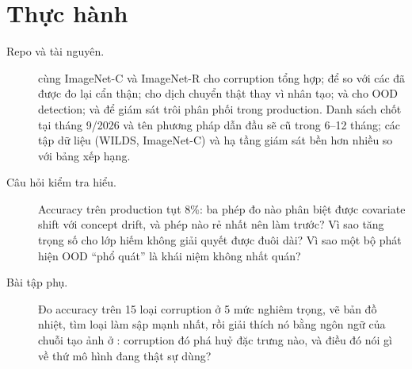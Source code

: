 \documentclass[../../deep_learning.tex]{subfiles}
\begin{document}
\section{Thực hành}
\begin{description}
\item[Repo và tài nguyên.]  cùng ImageNet-C và ImageNet-R cho corruption tổng hợp;  để so với các  đã được đo lại cẩn thận;  cho dịch chuyển thật thay vì nhân tạo;  và  cho OOD detection;  và  để giám sát trôi phân phối trong production. Danh sách chốt tại tháng 9/2026 và tên phương pháp dẫn đầu sẽ cũ trong 6--12 tháng; các tập dữ liệu (WILDS, ImageNet-C) và hạ tầng giám sát bền hơn nhiều so với bảng xếp hạng.
\item[Câu hỏi kiểm tra hiểu.] Accuracy trên production tụt 8\%: ba phép đo nào phân biệt được covariate shift với concept drift, và phép nào rẻ nhất nên làm trước? Vì sao tăng trọng số cho lớp hiếm không giải quyết được đuôi dài? Vì sao một bộ phát hiện OOD ``phổ quát'' là khái niệm không nhất quán?
\item[Bài tập phụ.] Đo accuracy trên 15 loại corruption ở 5 mức nghiêm trọng, vẽ bản đồ nhiệt, tìm loại làm sập mạnh nhất, rồi giải thích nó bằng ngôn ngữ của chuỗi tạo ảnh ở : corruption đó phá huỷ đặc trưng nào, và điều đó nói gì về thứ mô hình đang thật sự dùng?
\end{description}
\end{document}
